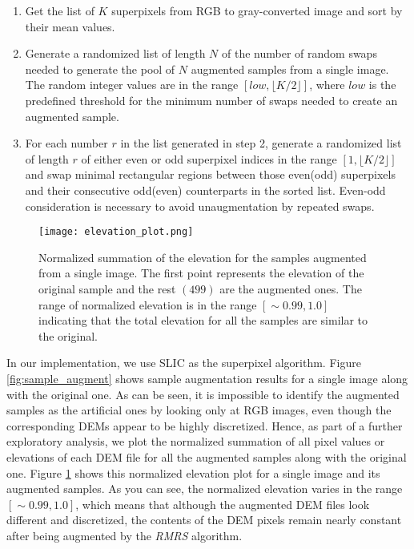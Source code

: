 \documentclass[10pt,twocolumn,letterpaper]{article}
\newcommand{\floor}[1]{\lfloor #1 \rfloor}
\begin{document}
\begin{enumerate}
	\item Get the list of $K$ superpixels from RGB to gray-converted image and sort by their mean values.
	\item Generate a randomized list of length $N$ of the number of random swaps needed to generate the pool of $N$ augmented samples from a single image. The random integer values are in the range $[low, \floor{K/2}]$, where $low$ is the predefined threshold for the minimum number of swaps needed to create an augmented sample.
	\item For each number $r$ in the list generated in step 2, generate a randomized list of length $r$  of either even or odd superpixel indices in the range $[1, \floor{K/2}]$ and swap minimal rectangular regions between those even(odd) superpixels and their consecutive odd(even) counterparts in the sorted list. Even-odd consideration is necessary to avoid unaugmentation by repeated swaps.
\end{enumerate}

\begin{figure}[h!]
	\centering
	\texttt{[image: elevation\_plot.png]}
    \caption{Normalized summation of the elevation for the samples augmented from a single image. The first point represents the elevation of the original sample and the rest $(499)$ are the augmented ones. The range of normalized elevation is in the range $[\sim0.99,1.0]$ indicating that the total elevation for all the samples are similar to the original.}
    \label{fig:elevation_plot}
\end{figure}

In our implementation, we use SLIC \cite{SLIC} as the superpixel algorithm. Figure \ref{fig:sample_augment} shows sample augmentation results for a single image along with the original one. As can be seen, it is impossible to identify the augmented samples as the artificial ones by looking only at RGB images, even though the corresponding DEMs appear to be highly discretized. Hence, as part of a further exploratory analysis, we plot the normalized summation of all pixel values or elevations of each DEM file for all the augmented samples along with the original one. Figure \ref{fig:elevation_plot} shows this normalized elevation plot for a single image and its augmented samples. As you can see, the normalized elevation varies in the range $[\sim0.99, 1.0]$, which means that although the augmented DEM files look different and discretized, the contents of the DEM pixels remain nearly constant after being augmented by the \textit{RMRS} algorithm.
\end{document}
